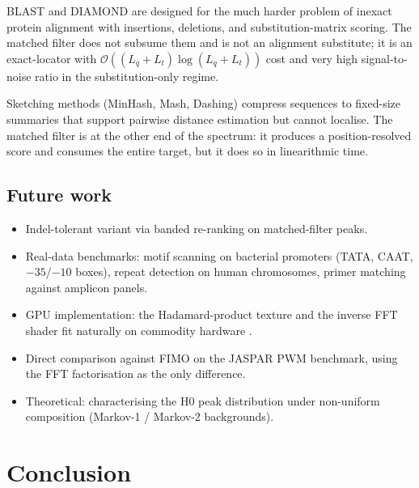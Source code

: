 \documentclass[11pt,a4paper]{article}
\theoremstyle{definition}
\theoremstyle{remark}
\newcommand{\bigO}{\mathcal{O}}
\begin{document}
BLAST \citep{altschul1990, altschul1997} and DIAMOND
\citep{buchfink2015} are designed for the much harder problem of
inexact protein alignment with insertions, deletions, and
substitution-matrix scoring. The matched filter does not subsume them
and is not an alignment substitute; it is an exact-locator with
$\bigO((L_q + L_t) \log(L_q + L_t))$ cost and very high signal-to-noise
ratio in the substitution-only regime.

Sketching methods (MinHash, Mash, Dashing) compress sequences to
fixed-size summaries that support pairwise distance estimation but
cannot localise. The matched filter is at the other end of the
spectrum: it produces a position-resolved score and consumes the
entire target, but it does so in linearithmic time.

\subsection{Future work}

\begin{itemize}
\item Indel-tolerant variant via banded re-ranking on matched-filter
peaks.
\item Real-data benchmarks: motif scanning on bacterial promoters
(TATA, CAAT, $-35$/$-10$ boxes), repeat detection on human
chromosomes, primer matching against amplicon panels.
\item GPU implementation: the Hadamard-product texture and the inverse
FFT shader fit naturally on commodity hardware
\citep{moreland2003, govindaraju2008, webgl2}.
\item Direct comparison against FIMO \citep{grant2011} on the JASPAR
PWM benchmark, using the FFT factorisation as the only difference.
\item Theoretical: characterising the H0 peak distribution under
non-uniform composition (Markov-1 / Markov-2 backgrounds).
\end{itemize}

\section{Conclusion}
\label{sec:conclusion}
\end{document}
